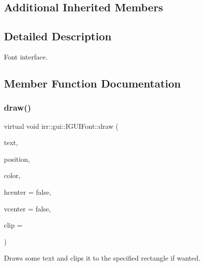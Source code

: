 \subsection*{Additional Inherited Members}


\subsection{Detailed Description}
Font interface. 

\subsection{Member Function Documentation}
\mbox{\label{classirr_1_1gui_1_1IGUIFont_af5627e546c474f31260fe671c24f9a33}} 
\subsubsection{\texorpdfstring{draw()}{draw()}\hspace{0.1cm}{\footnotesize\ttfamily [1/2]}}
{\footnotesize\ttfamily virtual void irr\+::gui\+::\+I\+G\+U\+I\+Font\+::draw (\begin{DoxyParamCaption}\item[{const \hyperlink{namespaceirr_1_1core_a5aedb62cb47cf01d1c548ab5e6344d2d}{core\+::stringw} \&}]{text,  }\item[{const \hyperlink{classirr_1_1core_1_1rect}{core\+::rect}$<$ \hyperlink{namespaceirr_ac66849b7a6ed16e30ebede579f9b47c6}{s32} $>$ \&}]{position,  }\item[{\hyperlink{classirr_1_1video_1_1SColor}{video\+::\+S\+Color}}]{color,  }\item[{bool}]{hcenter = {\ttfamily false},  }\item[{bool}]{vcenter = {\ttfamily false},  }\item[{const \hyperlink{classirr_1_1core_1_1rect}{core\+::rect}$<$ \hyperlink{namespaceirr_ac66849b7a6ed16e30ebede579f9b47c6}{s32} $>$ $\ast$}]{clip = {} }\end{DoxyParamCaption})\hspace{0.3cm}{\ttfamily [pure virtual]}}



Draws some text and clips it to the specified rectangle if wanted. 


